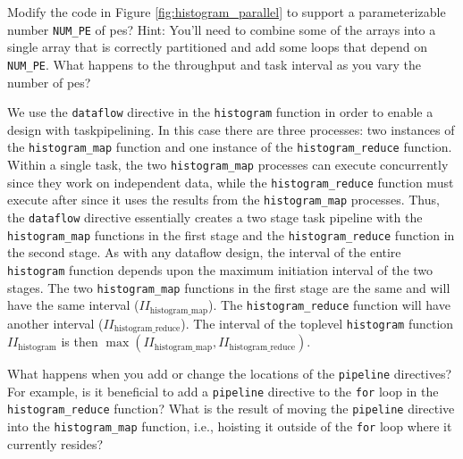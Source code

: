\begin{exercise}
Modify the code in Figure \ref{fig:histogram_parallel} to support a parameterizable number \lstinline|NUM_PE| of \glspl{pe}? Hint: You'll need to combine some of the arrays into a single array that is correctly partitioned and add some loops that depend on \lstinline|NUM_PE|.  What happens to the throughput and task interval as you vary the number of \glspl{pe}? 
\end{exercise}

We use the \lstinline{dataflow} directive in the \lstinline{histogram} function in order to enable a design with \gls{taskpipelining}.   In this case there are three processes: two instances of the \lstinline{histogram_map} function and one instance of the \lstinline{histogram_reduce} function. Within a single task, the two \lstinline{histogram_map} processes can execute concurrently since they work on independent data, while the \lstinline{histogram_reduce} function must execute after since it uses the results from the  \lstinline{histogram_map} processes. Thus, the \lstinline{dataflow} directive essentially creates a two stage task pipeline with the \lstinline{histogram_map} functions in the first stage and the \lstinline{histogram_reduce} function in the second stage.   As with any dataflow design, the interval of the entire \lstinline{histogram} function depends upon the maximum initiation interval of the two stages. The two \lstinline{histogram_map} functions in the first stage are the same and will have the same interval ($II_\mathrm{histogram\_map}$). The \lstinline{histogram_reduce} function will have another interval ($II_\mathrm{histogram\_reduce}$). The interval of the toplevel \lstinline{histogram} function $II_\mathrm{histogram}$ is then $\max (II_\mathrm{histogram\_map}, II_\mathrm{histogram\_reduce})$.

\begin{exercise}
What happens when you add or change the locations of the \lstinline{pipeline} directives? For example, is it beneficial to add a \lstinline{pipeline} directive to the \lstinline{for} loop in the \lstinline{histogram_reduce} function? What is the result of moving the \lstinline{pipeline} directive into the \lstinline{histogram_map} function, i.e., hoisting it outside of the \lstinline{for} loop where it currently resides? 
\end{exercise}

